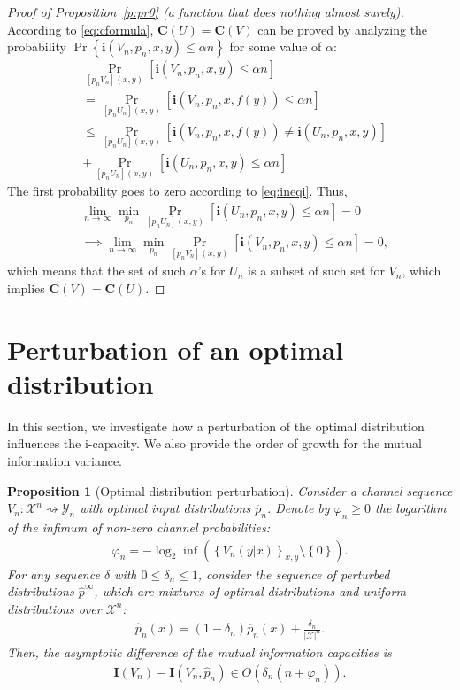 \documentclass[journal, twocol]{IEEEtran}
\newcommand{\op}{{\overline{p}}}
\newcommand{\hp}{{\hat{p}}}
\newcommand{\bfC}{{\mathbf{C}}}
\newcommand{\bfI}{{\mathbf{I}}}
\newcommand{\mX}{{\mathcal{X}}}
\newcommand{\mY}{{\mathcal{Y}}}
\newcommand{\set}[1]{{\left\{{#1}\right\}}}
\newcommand{\br}[1]{{\left({#1}\right)}}
\newcommand{\brsq}[1]{{\left[{#1}\right]}}
\newcommand{\vp}{\varphi}
\newcommand{\tosq}{\rightsquigarrow}
\newcommand{\bi}{\mathbf{i}}
\newtheorem{proposition}{Proposition}
\newcommand{\pW}[2]{[{#1}{#2}]}
\begin{document}
\begin{appendices}
\begin{proof}[Proof of Proposition~\ref{p:pr0} (a function that does nothing almost surely)]
According to \eqref{eq:cformula}, $\bfC(U)=\bfC(V)$ can be proved by analyzing the probability $\Pr\set{\bi(V_n,p_n,x,y)\leq\alpha n}$ for some value of $\alpha$:
\begin{align}
&\Pr_{\pW{p_n}{V_n}(x,y)}\brsq{\bi(V_n,p_n,x,y)\leq \alpha n}
\nonumber\\&=
\Pr_{\pW{p_n}{U_n}(x,y)}\brsq{\bi(V_n,p_n,x,f(y))\leq \alpha n}
\nonumber\\&
\leq \Pr_{\pW{p_n}{U_n}(x,y)}\brsq{\bi(V_n,p_n,x,f(y))\neq\bi(U_n,p_n,x,y)}
\nonumber\\&
+\Pr_{\pW{p_n}{U_n}(x,y)}\brsq{\bi(U_n,p_n,x,y)\leq\alpha n}
\label{eq:pruv}
\end{align}
The first probability goes to zero according to \eqref{eq:ineqi}. Thus, 
\begin{align}
&\lim_{n\to\infty}\min_{p_n}\Pr_{\pW{p_n}{U_n}(x,y)}\brsq{\bi(U_n,p_n,x,y)\leq \alpha n}=0 
\nonumber\\&\implies
\lim_{n\to\infty}\min_{p_n}\Pr_{\pW{p_n}{V_n}(x,y)}\brsq{\bi(V_n,p_n,x,y)\leq \alpha n}=0,
\end{align}
which means that the set of such $\alpha$'s for $U_n$ is a subset of such set for $V_n$, which implies $\bfC(V)=\bfC(U)$.
\end{proof}

\section{Perturbation of an optimal distribution}
\label{s:pert}

In this section, we investigate how a perturbation of the optimal distribution influences the i-capacity.
We also provide the order of growth for the mutual information variance.

\begin{proposition}[Optimal distribution perturbation]
\label{p:peps}
Consider a channel sequence $V_n:\mX^n\tosq\mY_n$ with optimal input distributions $\op_n$.
Denote by $\vp_n \geq 0$ the logarithm of the infimum of non-zero channel probabilities:
\begin{align}
\vp_n = -\log_2\inf\br{\set{V_n(y|x)}_{x,y}\setminus\set{0}}.
\label{eq:phin}
\end{align}
For any sequence $\delta$ with $0\leq \delta_n \leq 1$, consider the sequence of perturbed distributions $\hp^\infty$, which are mixtures of optimal distributions and uniform distributions over $\mX^n$:
\begin{align}
\hp_n(x)=\br{1-\delta_n}\op_n(x)+\frac{\delta_n}{|\mX|^n}.
\label{eq:ppert}
\end{align}
Then, the asymptotic difference of the mutual information capacities is
\begin{align}
\bfI(V_n) - \bfI(V_n,\hp_n) \in O(\delta_n(n+\vp_n)).
\label{eq:pertopt}
\end{align}


\end{proposition}
\end{appendices}
\end{document}
